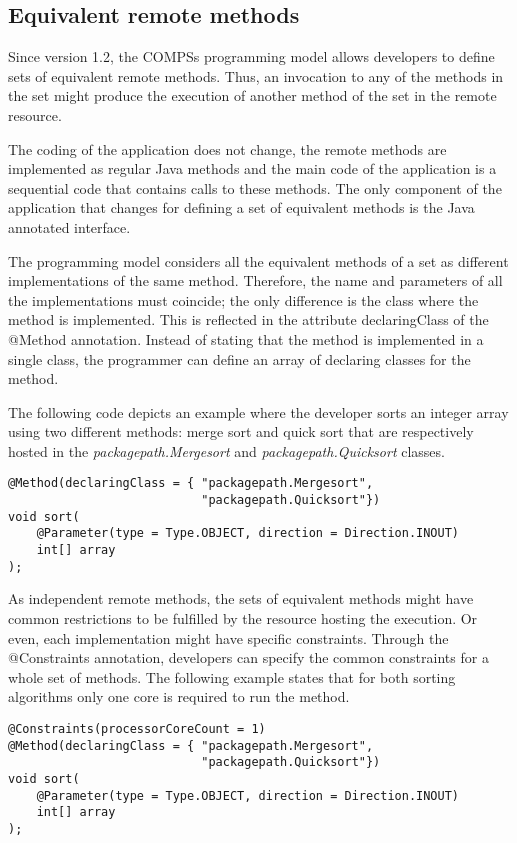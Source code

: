\subsection{Equivalent remote methods}
Since version 1.2, the COMPSs programming model allows developers to define sets of equivalent remote
methods. Thus, an invocation to any of the methods in the set might produce the execution of another
method of the set in the remote resource.

The coding of the application does not change, the remote methods are implemented as regular Java
methods and the main code of the application is a sequential code that contains calls to these methods. The
only component of the application that changes for defining a set of equivalent methods is the Java
annotated interface.

The programming model considers all the equivalent methods of a set as different implementations of the
same method. Therefore, the name and parameters of all the implementations must coincide; the only
difference is the class where the method is implemented. This is reflected in the attribute declaringClass of
the @Method annotation. Instead of stating that the method is implemented in a single class, the
programmer can define an array of declaring classes for the method.

The following code depicts an example where the developer sorts an integer array using two different
methods: merge sort and quick sort that are respectively hosted in the {\it packagepath.Mergesort} and
{\it packagepath.Quicksort} classes.

\begin{lstlisting}
@Method(declaringClass = { "packagepath.Mergesort",
                           "packagepath.Quicksort"})
void sort(
    @Parameter(type = Type.OBJECT, direction = Direction.INOUT)
    int[] array
);
\end{lstlisting}

As independent remote methods, the sets of equivalent methods might have common restrictions to be
fulfilled by the resource hosting the execution. Or even, each implementation might have specific constraints.
Through the @Constraints annotation, developers can specify the common constraints for a whole set of
methods. The following example states that for both sorting algorithms only one core is required to run the
method.

\begin{lstlisting}
@Constraints(processorCoreCount = 1)
@Method(declaringClass = { "packagepath.Mergesort",
                           "packagepath.Quicksort"})
void sort(
    @Parameter(type = Type.OBJECT, direction = Direction.INOUT)
    int[] array
);
\end{lstlisting}

